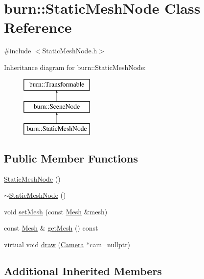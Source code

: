 \hypertarget{classburn_1_1_static_mesh_node}{\section{burn\-:\-:Static\-Mesh\-Node Class Reference}
\label{classburn_1_1_static_mesh_node}
}


{\ttfamily \#include $<$Static\-Mesh\-Node.\-h$>$}

Inheritance diagram for burn\-:\-:Static\-Mesh\-Node\-:\begin{figure}[H]
\begin{center}
\leavevmode
\includegraphics[height=3.000000cm]{classburn_1_1_static_mesh_node}
\end{center}
\end{figure}
\subsection*{Public Member Functions}
\begin{DoxyCompactItemize}
\item 
\hyperlink{classburn_1_1_static_mesh_node_a051ef5fe091cf8e93cc4dd1bae753cbd}{Static\-Mesh\-Node} ()
\item 
\hyperlink{classburn_1_1_static_mesh_node_a68e00b329768da175ee153c46069364e}{$\sim$\-Static\-Mesh\-Node} ()
\item 
void \hyperlink{classburn_1_1_static_mesh_node_af78ecebdfd7c25997caf35ef4ebecdfb}{set\-Mesh} (const \hyperlink{classburn_1_1_mesh}{Mesh} \&mesh)
\item 
const \hyperlink{classburn_1_1_mesh}{Mesh} \& \hyperlink{classburn_1_1_static_mesh_node_ad269a91df547f3a3092d193e4210e081}{get\-Mesh} () const 
\item 
virtual void \hyperlink{classburn_1_1_static_mesh_node_a7ff88bee9757061b0393ae5324e7989b}{draw} (\hyperlink{classburn_1_1_camera}{Camera} $\ast$cam=nullptr)
\end{DoxyCompactItemize}
\subsection*{Additional Inherited Members}


